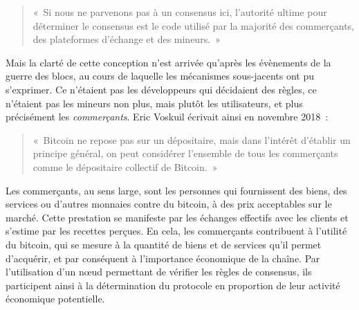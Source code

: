 \begin{quote}
«~Si nous ne parvenons pas à un consensus ici, l'autorité ultime pour déterminer le consensus est le code utilisé par la majorité des commerçants, des plateformes d'échange et des mineurs.~»
\end{quote} %

Mais la clarté de cette conception n'est arrivée qu'après les évènements de la guerre des blocs, au cours de laquelle les mécanismes sous-jacents ont pu s'exprimer. Ce n'étaient pas les développeurs qui décidaient des règles, ce n'étaient pas les mineurs non plus, mais plutôt les utilisateurs, et plus précisément les \emph{commerçants}. Eric Voskuil écrivait ainsi en novembre 2018~:

\begin{quote}
«~Bitcoin ne repose pas sur un dépositaire, mais dans l'intérêt d'établir un principe général, on peut considérer l'ensemble de tous les commerçants comme le dépositaire collectif de Bitcoin.~»
\end{quote}

Les commerçants, au sens large, sont les personnes qui fournissent des biens, des services ou d'autres monnaies contre du bitcoin, à des prix acceptables sur le marché. Cette prestation se manifeste par les échanges effectifs avec les clients et s'estime par les recettes perçues. En cela, les commerçants contribuent à l'utilité du bitcoin, qui se mesure à la quantité de biens et de services qu'il permet d'acquérir, et par conséquent à l'importance économique de la chaîne. Par l'utilisation d'un nœud permettant de vérifier les règles de consensus, ils participent ainsi à la détermination du protocole en proportion de leur activité économique potentielle.

